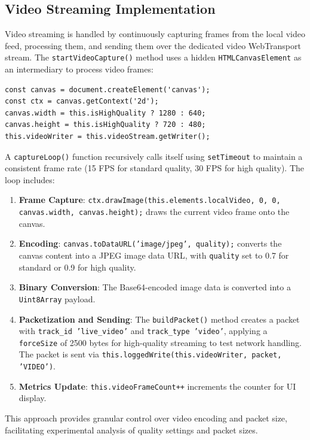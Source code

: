 \subsection{Video Streaming Implementation}
Video streaming is handled by continuously capturing frames from the local video feed, processing them, and sending them over the dedicated video WebTransport stream. The \texttt{startVideoCapture()} method uses a hidden \texttt{HTMLCanvasElement} as an intermediary to process video frames:

\begin{lstlisting}
const canvas = document.createElement('canvas');
const ctx = canvas.getContext('2d');
canvas.width = this.isHighQuality ? 1280 : 640;
canvas.height = this.isHighQuality ? 720 : 480;
this.videoWriter = this.videoStream.getWriter();
\end{lstlisting}

A \texttt{captureLoop()} function recursively calls itself using \texttt{setTimeout} to maintain a consistent frame rate (15 FPS for standard quality, 30 FPS for high quality). The loop includes:

\begin{enumerate}
    \item \textbf{Frame Capture}: \texttt{ctx.drawImage(this.elements.localVideo, 0, 0, canvas.width, canvas.height);} draws the current video frame onto the canvas.
    \item \textbf{Encoding}: \texttt{canvas.toDataURL('image/jpeg', quality);} converts the canvas content into a JPEG image data URL, with \texttt{quality} set to 0.7 for standard or 0.9 for high quality.
    \item \textbf{Binary Conversion}: The Base64-encoded image data is converted into a \texttt{Uint8Array} payload.
    \item \textbf{Packetization and Sending}: The \texttt{buildPacket()} method creates a packet with \texttt{track\_id 'live\_video'} and \texttt{track\_type 'video'}, applying a \texttt{forceSize} of 2500 bytes for high-quality streaming to test network handling. The packet is sent via \texttt{this.loggedWrite(this.videoWriter, packet, 'VIDEO')}.
    \item \textbf{Metrics Update}: \texttt{this.videoFrameCount++} increments the counter for UI display.
\end{enumerate}

This approach provides granular control over video encoding and packet size, facilitating experimental analysis of quality settings and packet sizes.

